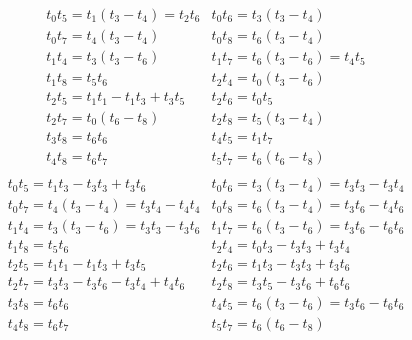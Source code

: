 \begin{align*}
    \begin{array}{ll}
        t_{0}t_{5} = t_{1}(t_{3} - t_{4}) = t_{2}t_{6}&
        t_{0}t_{6} = t_{3}(t_{3} - t_{4})\\
        t_{0}t_{7} = t_{4}(t_{3} - t_{4})&
        t_{0}t_{8} = t_{6}(t_{3} - t_{4})\\
        t_{1}t_{4} = t_{3}(t_{3} - t_{6})&
        t_{1}t_{7} = t_{6}(t_{3} - t_{6}) = t_{4}t_{5} \\
        t_{1}t_{8} = t_{5}t_{6}&
        t_{2}t_{4} = t_{0}(t_{3} - t_{6})\\
        t_{2}t_{5} = t_{1}t_{1} - t_{1}t_{3} + t_{3}t_{5}&
        t_{2}t_{6} = t_{0}t_{5}\\
        t_{2}t_{7} = t_{0}(t_{6} - t_{8})&
        t_{2}t_{8} = t_{5}(t_{3} - t_{4})\\
        t_{3}t_{8} = t_{6}t_{6}&
        t_{4}t_{5} = t_{1}t_{7} \\
        t_{4}t_{8} = t_{6}t_{7}&
        t_{5}t_{7} = t_{6}(t_{6} - t_{8})
    \end{array}
\end{align*}
\begin{align*}
    \begin{array}{ll}
        t_{0}t_{5} = t_{1}t_{3} - t_{3}t_{3} + t_{3}t_{6}&
        t_{0}t_{6} = t_{3}(t_{3} - t_{4}) = t_{3}t_{3} - t_{3}t_{4}\\
        t_{0}t_{7} = t_{4}(t_{3} - t_{4}) = t_{3}t_{4} - t_{4}t_{4}&
        t_{0}t_{8} = t_{6}(t_{3} - t_{4}) = t_{3}t_{6} - t_{4}t_{6}\\
        t_{1}t_{4} = t_{3}(t_{3} - t_{6}) = t_{3}t_{3} - t_{3}t_{6}&
        t_{1}t_{7} = t_{6}(t_{3} - t_{6}) = t_{3}t_{6} - t_{6}t_{6}\\
        t_{1}t_{8} = t_{5}t_{6}&
        t_{2}t_{4} = t_{0}t_{3} - t_{3}t_{3} + t_{3}t_{4}\\
        t_{2}t_{5} = t_{1}t_{1} - t_{1}t_{3} + t_{3}t_{5}&
        t_{2}t_{6} = t_{1}t_{3} - t_{3}t_{3} + t_{3}t_{6}\\
        t_{2}t_{7} = t_{3}t_{3} - t_{3}t_{6} - t_{3}t_{4} + t_{4}t_{6}&
        t_{2}t_{8} = t_{3}t_{5} - t_{3}t_{6} + t_{6}t_{6}\\
        t_{3}t_{8} = t_{6}t_{6}&
        t_{4}t_{5} = t_{6}(t_{3} - t_{6}) = t_{3}t_{6} - t_{6}t_{6}\\
        t_{4}t_{8} = t_{6}t_{7}&
        t_{5}t_{7} = t_{6}(t_{6} - t_{8})
    \end{array}
\end{align*}
